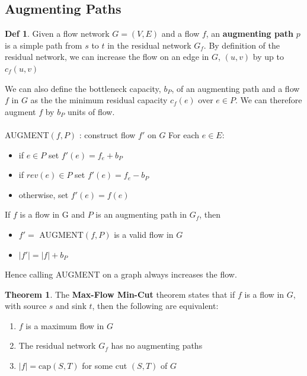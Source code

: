 \documentclass{article}
\theoremstyle{plain}
\theoremstyle{definition}
\newtheorem{thm}{Theorem}
\newtheorem{defn}[dummy]{Def}
\begin{document}
    \subsection{Augmenting Paths}
        \begin{defn}
            Given a flow network $G = (V, E)$ and a flow $f$, an \textbf{augmenting path} $p$ is a simple path from $s$ to $t$ in the residual network $G_f$. By definition of the residual network, we can increase the flow on an edge in $G$, $(u,v)$ by up to $c_f(u,v)$
        \end{defn}

        We can also define the bottleneck capacity, $b_P$, of an augmenting path and a flow $f$ in $G$ as the the minimum residual capacity $c_f(e)$ over $e \in P$. We can therefore augment $f$ by $b_P$ units of flow. \\ \\
        \noindent AUGMENT$(f, P)$ : construct flow $f'$ on $G$
        For each $e \in E$:
        \begin{itemize}
            \item if $e \in P$ set $f'(e) = f_e + b_P$
            \item if $rev(e) \in P$ set $f'(e) = f_e - b_P$
            \item otherwise, set $f'(e) = f(e)$
        \end{itemize}
        If $f$ is a flow in G and $P$ is an augmenting path in $G_f$, then
        \begin{itemize}
            \item $f' = $ AUGMENT$(f, P)$ is a valid flow in $G$
            \item $|f'| = |f| + b_P$
        \end{itemize}
        Hence calling AUGMENT on a graph always increases the flow. 
        
        \begin{thm}
            The \textbf{Max-Flow Min-Cut} theorem states that if $f$ is a flow in $G$, with source $s$ and sink $t$, then the following are equivalent:
            \begin{enumerate}
                \item $f$ is a maximum flow in $G$
                \item The residual network $G_f$ has no augmenting paths
                \item $|f| = \text{cap}(S,T)$ for some cut $(S,T)$ of $G$
            \end{enumerate}
        \end{thm}
\end{document}
